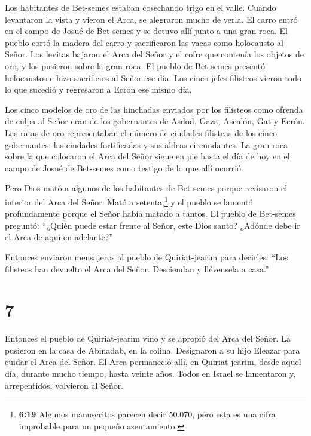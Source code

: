  Los habitantes de Bet-semes estaban cosechando trigo en el
valle. Cuando levantaron la vista y vieron el Arca, se alegraron mucho
de verla.  El carro entró en el campo de Josué de Bet-semes
y se detuvo allí junto a una gran roca. El pueblo cortó la madera del
carro y sacrificaron las vacas como holocausto al Señor. 
Los levitas bajaron el Arca del Señor y el cofre que contenía los
objetos de oro, y los pusieron sobre la gran roca. El pueblo de
Bet-semes presentó holocaustos e hizo sacrificios al Señor ese día.
 Los cinco jefes filisteos vieron todo lo que sucedió y
regresaron a Ecrón ese mismo día.

 Los cinco modelos de oro de las hinchadas enviados por los
filisteos como ofrenda de culpa al Señor eran de los gobernantes de
Asdod, Gaza, Ascalón, Gat y Ecrón.  Las ratas de oro
representaban el número de ciudades filisteas de los cinco gobernantes:
las ciudades fortificadas y sus aldeas circundantes. La gran roca sobre
la que colocaron el Arca del Señor sigue en pie hasta el día de hoy en
el campo de Josué de Bet-semes como testigo de lo que allí ocurrió.

 Pero Dios mató a algunos de los habitantes de Bet-semes
porque revisaron el interior del Arca del Señor. Mató a
setenta,\footnote{\textbf{6:19} Algunos manuscritos parecen decir
  50.070, pero esta es una cifra improbable para un pequeño
  asentamiento.} y el pueblo se lamentó profundamente porque el Señor
había matado a tantos.  El pueblo de Bet-semes preguntó:
``¿Quién puede estar frente al Señor, este Dios santo? ¿Adónde debe ir
el Arca de aquí en adelante?''

 Entonces enviaron mensajeros al pueblo de Quiriat-jearim
para decirles: ``Los filisteos han devuelto el Arca del Señor.
Desciendan y llévensela a casa.''

\hypertarget{section-6}{%
\section{7}\label{section-6}}

 Entonces el pueblo de Quiriat-jearim vino y se apropió del
Arca del Señor. La pusieron en la casa de Abinadab, en la colina.
Designaron a su hijo Eleazar para cuidar el Arca del Señor. 
El Arca permaneció allí, en Quiriat-jearim, desde aquel día, durante
mucho tiempo, hasta veinte años. Todos en Israel se lamentaron y,
arrepentidos, volvieron al Señor.

